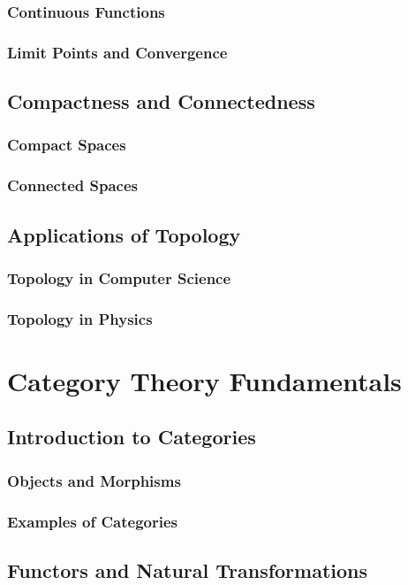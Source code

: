 \subsubsection{Continuous Functions}
\subsubsection{Limit Points and Convergence}
\subsection{Compactness and Connectedness}
\subsubsection{Compact Spaces}
\subsubsection{Connected Spaces}
\subsection{Applications of Topology}
\subsubsection{Topology in Computer Science}
\subsubsection{Topology in Physics}

\section{Category Theory Fundamentals}
\lipsum
\subsection{Introduction to Categories}
\subsubsection{Objects and Morphisms}
\subsubsection{Examples of Categories}
\subsection{Functors and Natural Transformations}

